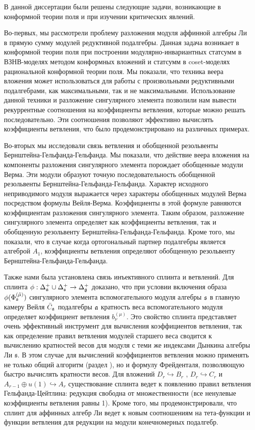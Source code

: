 \conclusion
\label{cha:conclusion}


В данной диссертации были решены следующие задачи, возникающие в конформной теории поля и при изучении критических явлений. 

Во-первых, мы рассмотрели проблему разложения модуля аффинной алгебры Ли в прямую сумму модулей редуктивной подалгебры. Данная задача возникает в конформной теории поля при построении модулярно-инвариантных статсумм в ВЗНВ-моделях методом конформных вложений и статсумм в coset-моделях рациональной конформной теории поля. Мы показали, что техника веера вложения может использоваться для работы с произвольными редуктивными подалгебрами, как максимальными, так и не максимальными. Использование данной техники и разложение сингулярного элемента позволили нам вывести рекуррентные соотношения на коэффициенты ветвления, которые можно решать последовательно. Эти соотношения позволяют эффективно вычислять коэффициенты ветвления, что было продемонстрировано на различных примерах.

Во-вторых  мы исследовали связь ветвления и обобщенной резольвенты Бернштейна-Гельфанда-Гельфанда. Мы показали, что действие веера вложения на компоненты разложения сингулярного элемента порождает обобщенные модули Верма. Эти модули образуют точную последовательность обобщенной резольвенты Бернштейна-Гельфанда-Гельфанда. Характер исходного неприводимого модуля выражается через характеры обобщенных модулей Верма посредством формулы Вейля-Верма. Коэффициенты в этой формуле равняются коэффициентам разложения сингулярного элемента. 
Таким образом, разложение сингулярного элемента определяет как коэффициенты ветвления, так и обобщенную резольвенту Бернштейна-Гельфанда-Гельфанда. 
Кроме того, мы показали, что в случае когда ортогональный партнер подалгебры является алгеброй $A_1$, коэффициенты ветвления  определяют обобщенную резольвенту Бернштейна-Гельфанда-Гельфанда. 

Также нами была установлена связь инъективного сплинта и ветвлений. Для сплинта $\phi:\Delta^+_{\mathfrak{a}}\cup \Delta^+_{\mathfrak{s}}\to \Delta^+_{\mathfrak{g}}$ доказано, что при условии включения образа  $\phi(\Phi_{\mathfrak{s}}^{(\tilde \mu)})$ сингулярного элемента вспомогательного модуля алгебры $\mathfrak{s}$ в главную камеру Вейля  $\bar C_{\mathfrak{a}}$ подалгебры $\mathfrak{a}$ кратность веса вспомогательного модуля определяет коэффициент ветвления $b_{\nu}^{(\mu)}$.  Это свойство сплинта представляет очень эффективный инструмент для вычисления коэффициентов ветвления, так как определение правил ветвления модулей старшего веса сводится к вычислению кратностей весов для модуля с теми же индексами Дынкина алгебры Ли $\mathfrak{s}$. В этом случае для вычислений коэффициентов ветвления можно применять не только общий алгоритм (раздел \label{sec:algorithm}), но и формулу Фрейденталя, позволяющую быстро вычислять кратности весов. 
Для вложений  $D_{r}\hookrightarrow B_{r}$ , $D_{r}\hookrightarrow C_{r}$ и $A_{r-1}\oplus u\left( 1\right) \hookrightarrow A_{r}$ существование сплинта ведет к появлению правил ветвления Гельфанда-Цейтлина: редукция свободна от множественности (все ненулевые коэффициенты ветвления равны 1). Кроме того, мы продемонстрировали, что сплинт для аффинных алгебр Ли ведет к новым соотношениям на тета-функции и функции ветвления для редукции на модули конечномерных подалгебр. 

